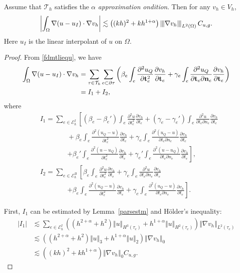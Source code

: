 \documentclass[leqno,final]{siamltex}
\numberwithin{equation}{section}
\newcommand{\norm}[1]{\left\Vert#1\right\Vert}
\newcommand{\norme}[1]{\left\Vert{\hskip -2.7pt}\left\vert #1 \right\vert{\hskip -2.7pt}\right\Vert}
\newcommand{\abs}[1]{\left\vert#1\right\vert}
\newcommand{\nn}{\nonumber}
\newcommand{\ls}{\lesssim}
\newcommand{\al}{\alpha}
\newcommand{\be}{\beta}
\newcommand{\ga}{\gamma}
\newcommand{\na}{\nabla}
\newcommand{\Om}{\Omega}
\newcommand{\pa}{\partial}
\newcommand{\bt}{{\rm\mathbf t}}
\newcommand{\bn}{{\rm\mathbf n}}
\newcommand{\T}{\mathcal{T}}
\newcommand{\E}{\mathcal{E}}
\newcommand{\eq}[1]{\begin{align}#1\end{align}}
\newcommand{\eqn}[1]{\begin{align*}#1\end{align*}}
\begin{document}
\begin{lemma} \label{uui}
Assume that $\T_h$ satisfies {the} \emph{$\al$ approximation ondition}. Then for any $v_h\in V_h$,
\eq{ \abs{\int_\Om\na(u-u_I)\cdot\na v_h}\ls \left((kh)^2+kh^{1+\al}\right)\norme{\na v_h}_{L^2(\Om)} C_{u,g}. }
Here $u_I$ is the linear interpolant of $u$ on $\Om$.
\end{lemma}
\begin{proof}
From \eqref{fdmtliequ}, we have
\eqn{
\int_\Om\na(u-u_I)\cdot\na v_h &= \sum_{\tau\in\T_h}\sum_{e\subset\pa\tau} \left( \be_e\int_e\frac{\pa^2 u_Q}{\pa \bt_e^2}\frac{\pa v_h}{\pa \bt_e} + \ga_e\int_e\frac{\pa^2 u_Q}{\pa \bt_e \pa \bn_e}\frac{\pa v_h}{\pa \bt_e} \right)\\
&= I_1+I_2,
}
where
\eqn{
&I_1 = \sum_{e\in\E_h^I} \left[ (\be_e-\be_e')\int_e\frac{\pa^2 u}{\pa t_e^2}\frac{\pa v_h}{\pa t_e} + (\ga_e-\ga_e')\int_e\frac{\pa^2 u}{\pa t_e \pa n_e}\frac{\pa v_h}{\pa t_e} \right. \\
&\qquad\qquad + \be_e\int_e\frac{\pa^2 (u_Q-u)}{\pa t_e^2}\frac{\pa v_h}{\pa t_e} + \ga_e \int_e\frac{\pa^2 (u_Q-u)}{\pa t_e \pa n_e}\frac{\pa v_h}{\pa t_e}\\
&\qquad\qquad \left. + \be_e'\int_e\frac{\pa^2 (u-u_Q)}{\pa t_e^2}\frac{\pa v_h}{\pa t_e} + \ga_e' \int_e\frac{\pa^2 (u-u_Q)}{\pa t_e \pa n_e}\frac{\pa v_h}{\pa t_e} \right],\\
&I_2 = \sum_{e\in\E_h^B} \left[ \be_e\int_e\frac{\pa^2 u}{\pa t_e^2}\frac{\pa v_h}{\pa t_e} + \ga_e\int_e\frac{\pa^2 u}{\pa t_e \pa n_e}\frac{\pa v_h}{\pa t_e} \right. \\
&\qquad\qquad \left. + \be_e\int_e\frac{\pa^2 (u_Q-u)}{\pa t_e^2}\frac{\pa v_h}{\pa t_e} + \ga_e \int_e\frac{\pa^2 (u_Q-u)}{\pa t_e \pa n_e}\frac{\pa v_h}{\pa t_e}\right].
}

First, $I_1$ can be estimated by Lemma~\ref{parsestm} and H\"{o}lder's inequality:
\eq{
\abs{I_1} &\ls \sum_{e\in\E_h^I} \left( (h^{2+\al}+h^2)\norm{u}_{H^{3}(\tau_e)} + h^{1+\al}\norm{u}_{H^{2}(\tau_e)} \right) \norm{\na v_h}_{L^2(\tau_e)} \label{I1est}\\
&\ls \left( (h^{2+\al}+h^2)\norm{u}_3 + h^{1+\al}\norm{u}_2 \right) \norm{\na v_h}_0\nn \\
&\ls \left( (kh)^{2} + kh^{1+\al} \right)\norm{\na v_h}_0  C_{u,g}.\nn
}


\end{proof}
\end{document}
